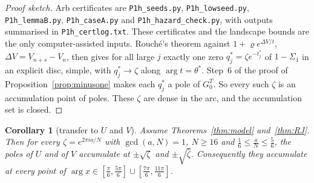 \documentclass[11pt]{article}
\theoremstyle{plain}
\newtheorem{corollary}[theorem]{Corollary}
\theoremstyle{definition}
\theoremstyle{remark}
\theoremstyle{plain}\newtheorem*{maintheorem}{Main Theorem}
\begin{document}
\begin{proof}[Proof sketch]
Arb certificates are \texttt{P1h\_seeds.py}, \texttt{P1h\_lowseed.py}, \texttt{P1h\_lemmaB.py},
\texttt{P1h\_caseA.py} and \texttt{P1h\_hazard\_check.py}, with outputs summarised in \texttt{P1h\_certlog.txt}.
These certificates and the landscape bounds are the only computer-assisted inputs. Rouch\'e's theorem against
$1+\varrho e^{\Delta V/t}$, $\Delta V=V_{n+s}-V_n$, then gives for all large $j$ exactly one zero
$q^\ast_j=\zeta e^{-t^\ast_j}$ of $1-\Sigma_1$ in an explicit disc, simple, with $q^\ast_j\to\zeta$ along
$\arg t=\theta^\ast$. Step~6 of the proof of Proposition~\ref{prop:minusone} makes each $q^\ast_j$ a pole of
$G^T_0$. So every such $\zeta$ is an accumulation point of poles. These $\zeta$ are dense in the arc,
and the accumulation set is closed.
\end{proof}

\begin{corollary}[transfer to $U$ and $V$]\label{cor:arcUV}
Assume Theorems~\ref{thm:model} and~\ref{thm:RJ}. Then for every $\zeta=e^{2\pi ia/N}$ with $\gcd(a,N)=1$,
$N\ge16$ and $\frac16\le\frac aN\le\frac56$, the poles of $U$ and of $V$ accumulate at $\pm\sqrt\zeta$ and
$\pm\sqrt{\bar\zeta}$. Consequently they accumulate at every point of
$\arg x\in[\frac\pi6,\frac{5\pi}6]\cup[\frac{7\pi}6,\frac{11\pi}6]$.
\end{corollary}
\end{document}
